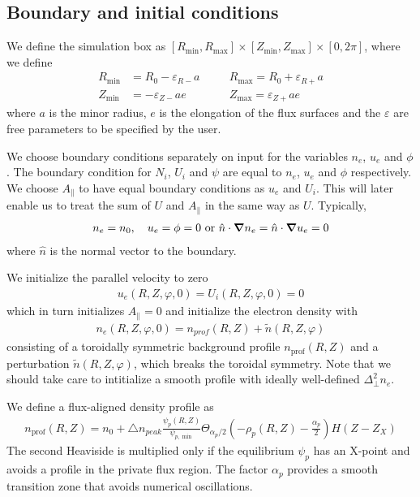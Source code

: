 \subsection{Boundary and initial conditions}
We define the simulation box as
$[ R_{\min}, R_{\max}]\times [Z_{\min}, Z_{\max}] \times [0,2\pi]$,
where we define
\begin{align} \label{eq:box}
    R_{\min}&=R_0-\varepsilon_{R-}a\quad
    &&R_{\max}=R_0+\varepsilon_{R+}a\nonumber\\
    Z_{\min}&=-\varepsilon_{Z-}ae\quad
    &&Z_{\max}=\varepsilon_{Z+}ae
\end{align}
where $a$ is the minor radius, $e$ is the elongation of the flux surfaces and
the $\varepsilon$ are free parameters to be specified by the user.

We choose boundary conditions separately on input for the variables
$n_e$, $u_e$ and $\phi$. The boundary condition for $N_i$, $U_i$ and
$\psi$ are equal to $n_e$, $u_e$ and $\phi$ respectively.
We choose $A_\parallel$ to have equal boundary conditions as $u_e$ and $U_i$.
This will later enable us to treat the sum of $U$ and $A_\parallel$
in the same way as $U$.
Typically,
\begin{align}
n_e = n_0, \quad u_e = \phi = 0
\text{ or } \hat n \cdot{\boldsymbol{\nabla}} n_e = \hat n \cdot{\boldsymbol{\nabla}} u_e = 0
\end{align}
where $\hat n$ is the normal vector to the boundary.

We initialize the parallel velocity to zero
\begin{align}
  u_e(R,Z,\varphi,0) = U_i(R,Z,\varphi,0) = 0
  \label{}
\end{align}
which in turn initializes $A_\parallel = 0$
and initialize the electron density with
\begin{align} \label{eq:initial_ne}
    n_e(R,Z,\varphi, 0)= n_{prof}(R,Z) + \tilde n(R,Z,\varphi)
\end{align}
consisting of a toroidally symmetric background profile $n_{\text{prof}}(R,Z)$ and a perturbation
$\tilde n(R,Z,\varphi)$, which breaks the toroidal symmetry.
Note that we should take care to intitialize a smooth profile with ideally well-defined $\Delta^2_\perp n_e$.

We define a flux-aligned density profile as
\begin{align} \label{eq:density_profile}
  n_{\text{prof}}(R,Z)=
  n_0 + \triangle n_{peak}\frac{\psi_p(R,Z) }{\psi_{p,\min}}\Theta_{\alpha_p/2}\left(-\rho_p(R, Z)-\frac{\alpha_p}{2}\right) H(Z-Z_X)
\end{align}
The second Heaviside is multiplied only if the equilibrium $\psi_p$ has an
X-point and avoids a profile in the private flux region. The factor $\alpha_p$ provides a smooth transition
zone that avoids numerical oscillations.


